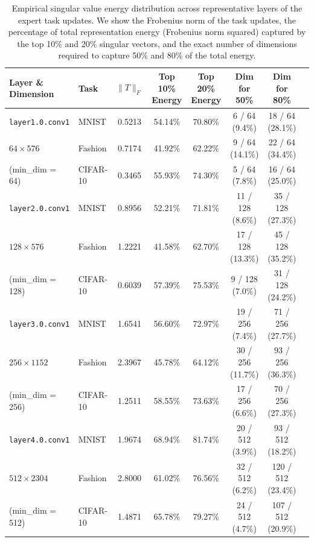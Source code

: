 \documentclass{article}
\theoremstyle{plain}
\theoremstyle{definition}
\theoremstyle{remark}
\begin{document}
\begin{table}[h]
\caption{Empirical singular value energy distribution across representative layers of the expert task updates. We show the Frobenius norm of the task updates, the percentage of total representation energy (Frobenius norm squared) captured by the top 10\% and 20\% singular vectors, and the exact number of dimensions required to capture 50\% and 80\% of the total energy.}
\label{tab:spectral_energy}
\vskip 0.15in
\begin{center}
\begin{scriptsize}
\begin{sc}
\setlength{\tabcolsep}{4.5pt}
\begin{tabular}{llcccccc}
\toprule
Layer \& Dimension & Task & $\|T\|_F$ & Top 10\% Energy & Top 20\% Energy & Dim for 50\% & Dim for 80\% \\
\midrule
\texttt{layer1.0.conv1} & MNIST & 0.5213 & 54.14\% & 70.80\% & 6 / 64 (9.4\%) & 18 / 64 (28.1\%) \\
$64 \times 576$ & Fashion & 0.7174 & 41.92\% & 62.22\% & 9 / 64 (14.1\%) & 22 / 64 (34.4\%) \\
(min\_dim = 64) & CIFAR-10 & 0.3465 & 55.93\% & 74.30\% & 5 / 64 (7.8\%) & 16 / 64 (25.0\%) \\
\midrule
\texttt{layer2.0.conv1} & MNIST & 0.8956 & 52.21\% & 71.81\% & 11 / 128 (8.6\%) & 35 / 128 (27.3\%) \\
$128 \times 576$ & Fashion & 1.2221 & 41.58\% & 62.70\% & 17 / 128 (13.3\%) & 45 / 128 (35.2\%) \\
(min\_dim = 128) & CIFAR-10 & 0.6039 & 57.39\% & 75.53\% & 9 / 128 (7.0\%) & 31 / 128 (24.2\%) \\
\midrule
\texttt{layer3.0.conv1} & MNIST & 1.6541 & 56.60\% & 72.97\% & 19 / 256 (7.4\%) & 71 / 256 (27.7\%) \\
$256 \times 1152$ & Fashion & 2.3967 & 45.78\% & 64.12\% & 30 / 256 (11.7\%) & 93 / 256 (36.3\%) \\
(min\_dim = 256) & CIFAR-10 & 1.2511 & 58.55\% & 73.63\% & 17 / 256 (6.6\%) & 70 / 256 (27.3\%) \\
\midrule
\texttt{layer4.0.conv1} & MNIST & 1.9674 & 68.94\% & 81.74\% & 20 / 512 (3.9\%) & 93 / 512 (18.2\%) \\
$512 \times 2304$ & Fashion & 2.8000 & 61.02\% & 76.56\% & 32 / 512 (6.2\%) & 120 / 512 (23.4\%) \\
(min\_dim = 512) & CIFAR-10 & 1.4871 & 65.78\% & 79.27\% & 24 / 512 (4.7\%) & 107 / 512 (20.9\%) \\
\bottomrule
\end{tabular}
\end{sc}
\end{scriptsize}
\end{center}
\vskip -0.1in
\end{table}
\end{document}
